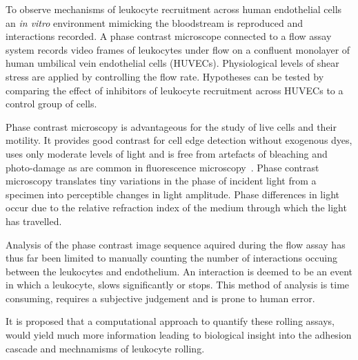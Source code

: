 To observe mechanisms of leukocyte recruitment across human endothelial cells an \emph{in vitro} environment mimicking the bloodstream is reproduced and interactions recorded. A phase contrast microscope connected to a flow assay system records video frames of leukocytes under flow on a confluent monolayer of human umbilical vein endothelial cells (HUVECs). Physiological levels of shear stress are applied by controlling the flow rate. Hypotheses can be tested by comparing the effect of inhibitors of leukocyte recruitment across HUVECs to a control group of cells.

Phase contrast microscopy is advantageous for the study of live cells and their motility. It provides good contrast for cell edge detection without exogenous dyes, uses only moderate levels of light and is free from artefacts of bleaching and photo-damage as are common in fluorescence microscopy~\cite{Ambuhl2012}. Phase contrast microscopy translates tiny variations in the phase of incident light from a specimen into perceptible changes in light amplitude. Phase differences in light occur due to the relative refraction index of the medium through which the light has travelled.

Analysis of the phase contrast image sequence aquired during the flow assay has thus far been limited to manually counting the number of interactions occuing between the leukocytes and endothelium. An interaction is deemed to be an event in which a leukocyte, slows significantly or stops. This method of analysis is time consuming, requires a subjective judgement and is prone to human error.

It is proposed that a computational approach to quantify these rolling assays, would yield much more information leading to biological insight into the adhesion cascade and mechnamisms of leukocyte rolling.

